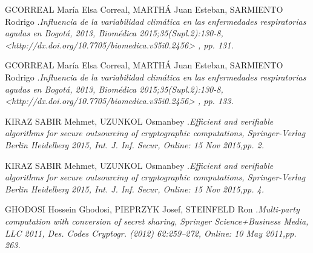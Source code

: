 \documentclass[a4paper, 11pt, oneside]{article}
\theoremstyle{definition}
\theoremstyle{remark}
\begin{document}
\begin{thebibliography}{99}
 GCORREAL María Elsa Correal, MARTHÁ Juan Esteban, SARMIENTO Rodrigo .\emph{Influencia de la variabilidad climática en las enfermedades respiratorias agudas en Bogotá, 2013, Biomédica 2015;35(Supl.2):130-8, <http://dx.doi.org/10.7705/biomedica.v35i0.2456> , pp. 131.}

 GCORREAL María Elsa Correal, MARTHÁ Juan Esteban, SARMIENTO Rodrigo .\emph{Influencia de la variabilidad climática en las enfermedades respiratorias agudas en Bogotá, 2013, Biomédica 2015;35(Supl.2):130-8, <http://dx.doi.org/10.7705/biomedica.v35i0.2456> , pp. 133.}

KIRAZ SABIR Mehmet, UZUNKOL Osmanbey .\emph{Efficient and verifiable algorithms for secure outsourcing of cryptographic computations, Springer-Verlag Berlin Heidelberg 2015, Int. J. Inf. Secur, Online: 15 Nov 2015,pp. 2.}

KIRAZ SABIR Mehmet, UZUNKOL Osmanbey .\emph{Efficient and verifiable algorithms for secure outsourcing of cryptographic computations, Springer-Verlag Berlin Heidelberg 2015, Int. J. Inf. Secur, Online: 15 Nov 2015,pp. 4.}

GHODOSI Hossein Ghodosi, PIEPRZYK Josef, STEINFELD Ron .\emph{Multi-party computation with conversion of secret sharing, Springer Science+Business Media, LLC 2011, Des. Codes Cryptogr. (2012) 62:259–272, Online: 10 May 2011,pp. 263.}

\end{thebibliography}
\end{document}
